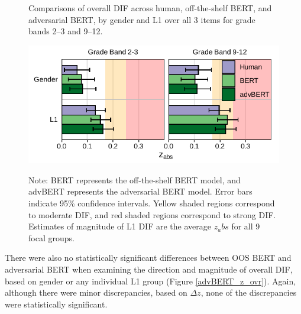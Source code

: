 \documentclass [PhD] {uclathes}
\begin{document}
\begin{figure}[!htb]
    \centering
    \caption{Comparisons of overall DIF across human, off-the-shelf BERT, and adversarial BERT, by gender and L1 over all 3 items for grade bands 2–3 and 9–12.}    
    \includegraphics[width=4.5in]{figures/20230517_ETS-DIF_advBERT_zabs_ovr_edit.pdf}
    \label{advBERT_zabs_ovr}
\caption*{\small Note: BERT represents the off-the-shelf BERT model, and advBERT represents the adversarial BERT model. Error bars indicate 95\% confidence intervals. Yellow shaded regions correspond to moderate DIF, and red shaded regions correspond to strong DIF. Estimates of magnitude of L1 DIF are the average $z_abs$ for all 9 focal groups.}
\end{figure}

There were also no statistically significant differences between OOS BERT and adversarial BERT when examining the direction and magnitude of overall DIF, based on gender or any individual L1 group (Figure \ref{advBERT_z_ovr}). Again, although there were minor discrepancies, based on $\Delta z$, none of the discrepancies were statistically significant.
\end{document}
